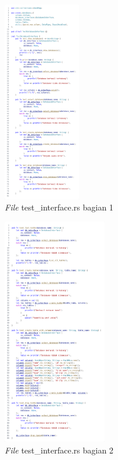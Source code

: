 \begin{figure}[H]
  \centering{}
	\includegraphics[width=0.3\textwidth]{gambar/lampiran/file-test-database-interface-1.png}
  \caption{\emph{File} test\_interface.rs bagian 1}
\end{figure}

\begin{figure}[H]
  \centering{}
	\includegraphics[width=0.4\textwidth]{gambar/lampiran/file-test-database-interface-2.png}
  \caption{\emph{File} test\_interface.rs bagian 2}
\end{figure}

